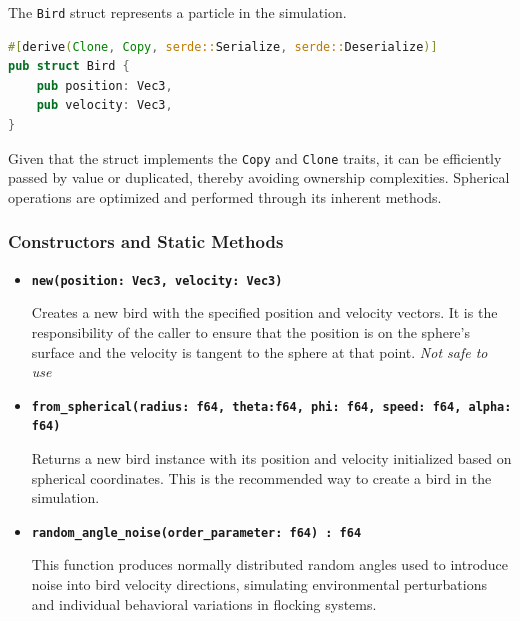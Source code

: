 \documentclass[12pt,a4paper]{article}
\begin{document}
The \texttt{Bird} struct represents a particle in the simulation.
\begin{lstlisting}[language=rust, caption={\texttt{Bird} struct}, label={lst:bird_struct}]
#[derive(Clone, Copy, serde::Serialize, serde::Deserialize)]
pub struct Bird { 
    pub position: Vec3,
    pub velocity: Vec3,
}
\end{lstlisting}
Given that the struct implements the \texttt{Copy} and \texttt{Clone} traits, it can be efficiently passed by value or duplicated, thereby avoiding ownership complexities. Spherical operations are optimized and performed through its inherent methods.
\subsubsection{Constructors and Static Methods}
\begin{itemize}
    \item \textbf{\texttt{new(position: Vec3, velocity: Vec3)}}
    
    Creates a new bird with the specified position and velocity vectors. It is the responsibility of the caller to ensure that the position is on the sphere's surface and the velocity is tangent to the sphere at that point. \emph{Not safe to use}

    \item \textbf{\texttt{from\_spherical(radius: f64, theta:f64, phi: f64, speed: f64, alpha: f64)}}

    Returns a new bird instance with its position and velocity initialized based on spherical coordinates. This is the recommended way to create a bird in the simulation.

    \item \textbf{\texttt{random\_angle\_noise(order\_parameter: f64) : f64}}
    
    This function produces normally distributed random angles used to introduce noise into bird velocity directions, simulating environmental perturbations and individual behavioral variations in flocking systems.
\end{itemize}
\end{document}
